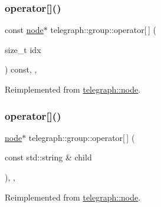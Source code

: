 \subsubsection{\texorpdfstring{operator[]()}{operator[]()}\hspace{0.1cm}{\footnotesize\ttfamily [2/4]}}
{\footnotesize\ttfamily const \hyperlink{classtelegraph_1_1node}{node}$\ast$ telegraph\+::group\+::operator\mbox{[}$\,$\mbox{]} (\begin{DoxyParamCaption}\item[{size\+\_\+t}]{idx }\end{DoxyParamCaption}) const\hspace{0.3cm}{\ttfamily [inline]}, {\ttfamily [override]}, {\ttfamily [virtual]}}



Reimplemented from \hyperlink{classtelegraph_1_1node_a4a2a451694b0a4b2c4ec26eee02e46ad}{telegraph\+::node}.

\mbox{\label{classtelegraph_1_1group_a84db0dc9c8d45bdd343a0d4da44a3593}} 
\subsubsection{\texorpdfstring{operator[]()}{operator[]()}\hspace{0.1cm}{\footnotesize\ttfamily [3/4]}}
{\footnotesize\ttfamily \hyperlink{classtelegraph_1_1node}{node}$\ast$ telegraph\+::group\+::operator\mbox{[}$\,$\mbox{]} (\begin{DoxyParamCaption}\item[{const std\+::string \&}]{child }\end{DoxyParamCaption})\hspace{0.3cm}{\ttfamily [inline]}, {\ttfamily [override]}, {\ttfamily [virtual]}}



Reimplemented from \hyperlink{classtelegraph_1_1node_a3cf657c57fe639f6288f2acdd9b50e3c}{telegraph\+::node}.

\mbox{\label{classtelegraph_1_1group_abc407505a0b1d0f1c3de0f588f8ea7a0}} 
